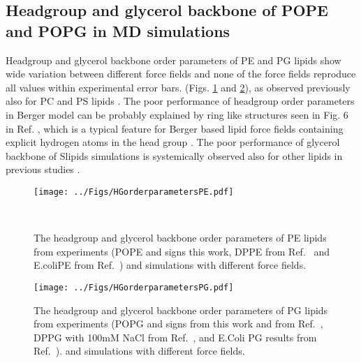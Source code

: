 \documentclass[aps,prl,superscriptaddress,twocolumn]{revtex4}
\begin{document}
\subsection{Headgroup and glycerol backbone of POPE and POPG in MD simulations}
Headgroup and glycerol backbone order parameters of PE and PG lipids
show wide variation between different force fields
and none of the force fields reproduce all values within experimental error bars.
(Figs. \ref{HGorderParametersPE} and \ref{HGorderParametersPOPG}),
as observed previously also for PC and PS lipids \cite{botan15,antila19}.
The poor performance of headgroup order parameters in Berger model can be probably explained by
ring like structures seen in Fig. 6 in Ref. , which is a typical feature
for Berger based lipid force fields containing explicit hydrogen atoms in the head group \cite{zhao08,henin09,dahlberg10}.
The poor performance of glycerol backbone of Slipids simulations is systemically observed also
for other lipids in previous studies \cite{botan15,antila19}.

\begin{figure}[]
  \centering
  \texttt{[image: ../Figs/HGorderparametersPE.pdf]}
  \caption{\label{HGorderParametersPE}
    The headgroup and glycerol backbone order parameters of PE lipids
    from experiments (POPE and signs this work, DPPE from Ref.~
    and E.coliPE from Ref.~) and simulations with different force fields.
  }
   \\
\end{figure}

\begin{figure}[!h]
  \centering
  \texttt{[image: ../Figs/HGorderparametersPG.pdf]}
  \caption{\label{HGorderParametersPOPG}
    The headgroup and glycerol backbone order parameters of PG lipids
    from experiments (POPG and signs from this work and from Ref.~, %
    DPPG with 100mM NaCl from Ref.~,%
    and E.Coli PG results from Ref.~).
    and simulations with different force fields.
  }
\end{figure}
\end{document}
